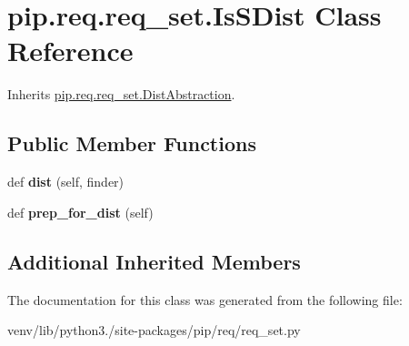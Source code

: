 \hypertarget{classpip_1_1req_1_1req__set_1_1_is_s_dist}{}\section{pip.\+req.\+req\+\_\+set.\+Is\+S\+Dist Class Reference}
\label{classpip_1_1req_1_1req__set_1_1_is_s_dist}


Inherits \hyperlink{classpip_1_1req_1_1req__set_1_1_dist_abstraction}{pip.\+req.\+req\+\_\+set.\+Dist\+Abstraction}.

\subsection*{Public Member Functions}
\begin{DoxyCompactItemize}
\item 
\mbox{\label{classpip_1_1req_1_1req__set_1_1_is_s_dist_ae8d7dae3e2b6f2a65faec811fce055c7}} 
def {\bfseries dist} (self, finder)
\item 
\mbox{\label{classpip_1_1req_1_1req__set_1_1_is_s_dist_a67587aadc7d8739aeee4bb868307440c}} 
def {\bfseries prep\+\_\+for\+\_\+dist} (self)
\end{DoxyCompactItemize}
\subsection*{Additional Inherited Members}


The documentation for this class was generated from the following file\+:\begin{DoxyCompactItemize}
\item 
venv/lib/python3./site-\/packages/pip/req/req\+\_\+set.\+py\end{DoxyCompactItemize}
